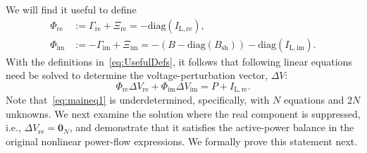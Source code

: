 \documentclass[10 pt, conference]{ieeeconf}
\begin{document}
We will find it useful to define
\begin{align} \label{eq:UsefulDefs}
\Phi_\mathrm{re} &:= \Gamma_\mathrm{re} + \Xi_\mathrm{re} = - \mathrm{diag}(I_\mathrm{L,re}), \\
\Phi_\mathrm{im} &:= -\Gamma_\mathrm{im} + \Xi_\mathrm{im} = - (B - \mathrm{diag}(B_\mathrm{sh})) - \mathrm{diag}(I_\mathrm{L,im}). \nonumber
\end{align}
With the definitions in~\eqref{eq:UsefulDefs}, it follows that following linear equations need be solved to determine the voltage-perturbation vector, $\Delta V$:
\begin{equation} \label{eq:maineq1}
\Phi_\mathrm{re} \Delta V_\mathrm{re} + \Phi_\mathrm{im} \Delta V_\mathrm{im} = P + I_\mathrm{L,re}.
\end{equation}
Note that~\eqref{eq:maineq1} is underdetermined, specifically, with $N$ equations and $2N$ unknowns. We next examine the solution where the real component is suppressed, i.e., $\Delta V_\mathrm{re} = \mathbf{0}_N$, and demonstrate that it  satisfies the active-power balance in the original nonlinear power-flow expressions. We formally prove this statement next. 
\end{document}

